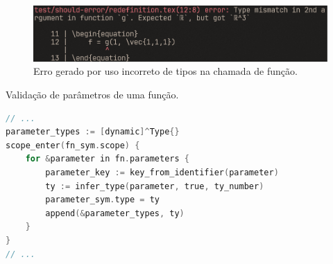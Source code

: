 \begin{figure}[H]
    \caption{\label{fig-type-mismatch} \small Erro gerado por uso incorreto de tipos na chamada de função.}
    \begin{center}
        \includegraphics[scale=0.5]{./Imagens/error-type-mismatch.png}
    \end{center}
\end{figure}


\begin{codigo}[H]
    \caption{\small Validação de parâmetros de uma função.}
    \label{cod-parametros-validation}
\begin{lstlisting}[language=C, numbers=none, frame=none, inputencoding=latin1]
// ...
parameter_types := [dynamic]^Type{}
scope_enter(fn_sym.scope) {
    for &parameter in fn.parameters {
        parameter_key := key_from_identifier(parameter)
        ty := infer_type(parameter, true, ty_number)
        parameter_sym.type = ty
        append(&parameter_types, ty)
    }
}
// ...
\end{lstlisting}
\end{codigo}

%

%
%

